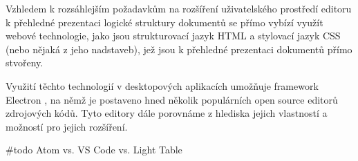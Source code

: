 Vzhledem k rozsáhlejším požadavkům na rozšíření uživatelského prostředí editoru k přehledné prezentaci logické struktury
dokumentů se přímo vybízí využít webové technologie, jako jsou strukturovací jazyk HTML a stylovací jazyk CSS (nebo
nějaká z jeho nadstaveb), jež jsou k přehledné prezentaci dokumentů přímo stvořeny. \cite{w3-html-css}

Využití těchto technologií v desktopových aplikacích umožňuje framework Electron \cite{electron-docs}, na němž je
postaveno hned několik populárních open source editorů zdrojových kódů. Tyto editory dále porovnáme z hlediska jejich
vlastností a možností pro jejich rozšíření.

\#todo Atom vs. VS Code vs. Light Table
